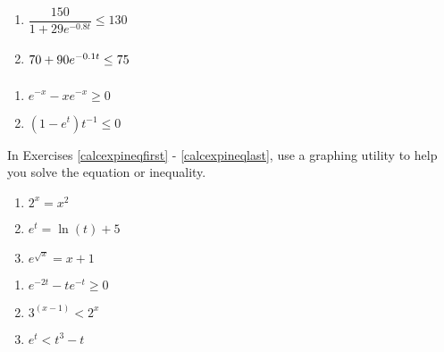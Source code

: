 \begin{multicols}{2} 
\begin{enumerate}
\setcounter{enumi}{\value{HW}}

\item $\dfrac{150}{1 + 29e^{-0.8t}} \leq 130$

\item $\vphantom{\dfrac{150}{1 + 29e^{-0.8t}}} 70 + 90e^{-0.1t} \leq 75$

\setcounter{HW}{\value{enumi}}
\end{enumerate}
\end{multicols}

\begin{multicols}{2} 
\begin{enumerate}
\setcounter{enumi}{\value{HW}}

\item $e^{-x} - xe^{-x} \geq 0$
\item $(1-e^{t}) t^{-1} \leq 0$ \label{expineqlast}

\setcounter{HW}{\value{enumi}}
\end{enumerate}
\end{multicols}

In Exercises \ref{calcexpineqfirst} - \ref{calcexpineqlast},  use a graphing utility to help you solve the equation or  inequality.

\begin{multicols}{3} 
\begin{enumerate}
\setcounter{enumi}{\value{HW}}

\item $2^{x} = x^2$ \label{calcexpineqfirst} 
\item $e^{t} = \ln(t) + 5$   
\item $e^{\sqrt{x}} = x + 1$ 

\setcounter{HW}{\value{enumi}}
\end{enumerate}
\end{multicols}

\begin{multicols}{3} 
\begin{enumerate}
\setcounter{enumi}{\value{HW}}

\item  $e^{-2t}-te^{-t} \geq 0$
\item $3^{(x - 1)} < 2^{x}$ 
\item $e^{t} < t^{3} - t$ \label{calcexpineqlast} 

\setcounter{HW}{\value{enumi}}
\end{enumerate}
\end{multicols}


